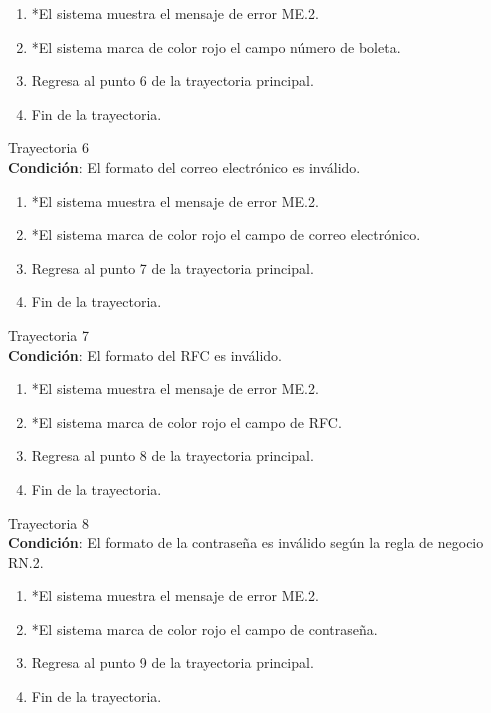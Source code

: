 \begin{enumerate}
    \item *El sistema muestra el mensaje de error ME.2.
    \item *El sistema marca de color rojo el campo número de boleta.
    \item Regresa al punto 6 de la trayectoria principal.
    \item Fin de la trayectoria.
\end{enumerate}
\large{Trayectoria 6}\\
\textbf{Condición}: El formato del correo electrónico es inválido.
\begin{enumerate}
    \item *El sistema muestra el mensaje de error ME.2.
    \item *El sistema marca de color rojo el campo de correo electrónico.
    \item Regresa al punto 7 de la trayectoria principal.
    \item Fin de la trayectoria.
\end{enumerate}
\large{Trayectoria 7}\\
\textbf{Condición}: El formato del RFC es inválido.
\begin{enumerate}
    \item *El sistema muestra el mensaje de error ME.2.
    \item *El sistema marca de color rojo el campo de RFC.
    \item Regresa al punto 8 de la trayectoria principal.
    \item Fin de la trayectoria.
\end{enumerate}
\large{Trayectoria 8}\\
\textbf{Condición}: El formato de la contraseña es inválido según la regla de negocio RN.2.
\begin{enumerate}
    \item *El sistema muestra el mensaje de error ME.2.
    \item *El sistema marca de color rojo el campo de contraseña.
    \item Regresa al punto 9 de la trayectoria principal.
    \item Fin de la trayectoria.
\end{enumerate}